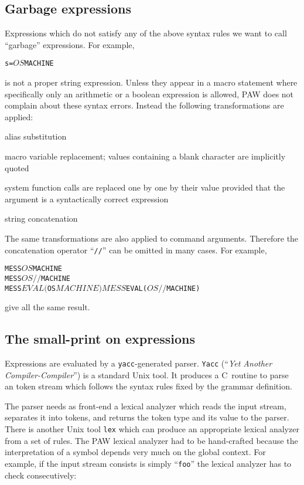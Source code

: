 \subsection{Garbage expressions\label{sec-garbage-expr}}

Expressions which do not satisfy any of the above syntax
rules we want to call ``garbage'' expressions.
For example,
\begin{alltt}
s = $OS$MACHINE
\end{alltt}
is not a proper string expression.
Unless they appear
in a macro statement where specifically only an arithmetic or a
boolean expression is allowed,
PAW does not complain about these syntax errors.
Instead the following transformations are applied:
\begin{OL}
\item
alias substitution
\item
macro variable replacement; values containing a blank character are
implicitly quoted
\item
system function calls are replaced one by one by their value provided
that the argument is a syntactically correct expression
\item
string concatenation
\end{OL}

The same transformations are also applied to command arguments.
Therefore the concatenation operator ``\texttt{//}'' can be omitted in
many cases.
For example,
\begin{alltt}
MESS $OS$MACHINE
MESS $OS//$MACHINE
MESS $EVAL($OS$MACHINE)
MESS $EVAL($OS//$MACHINE)
\end{alltt}
give all the same result.


\subsection{The small-print on expressions}
\small

Expressions are evaluated by a \texttt{yacc}-generated parser.
\texttt{Yacc} (``\emph{Yet Another Compiler-Compiler}'') is a standard
Unix tool.
It produces a C~routine to parse an token stream which follows the syntax rules
fixed by the grammar definition.

The parser needs as front-end a lexical analyzer which reads the input
stream, separates it into tokens, and returns the token type and its
value to the parser.
There is another Unix tool \texttt{lex} which can produce an appropriate
lexical analyzer from a set of rules.
The PAW lexical analyzer had to be hand-crafted
because the interpretation of a symbol depends very much on the global
context.
For example,
if the input stream consists is simply ``\texttt{foo}'' the lexical
analyzer has to check consecutively:

